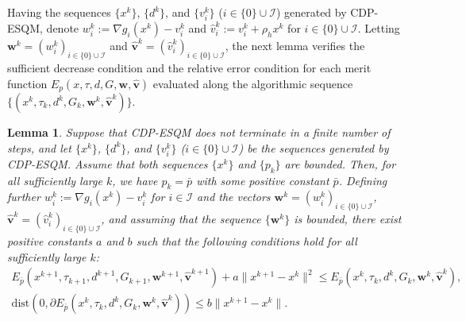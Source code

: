 \documentclass[11pt,a4paper]{article}
\def\hat{\widehat}\def\Hat{\widehat}
\newtheorem{lemma}[theorem]{Lemma}
\theoremstyle{plain}
\begin{document}
Having the sequences $\{x^k\}$, $\{d^k\}$, {and $\{v_i^k\}$ ($i\in \{0\} \cup \mathcal I$)} generated by CDP-ESQM, denote $w_i^k := \nabla g_i(x^k) - v_i^k$ and $\hat{v}_i^k:=v_i^k+\rho_h x^k$ for {$i \in \{0\} \cup \mathcal I$}. {Letting $\mathbf{w}^k = (w_i^k)_{i\in\{0\}\cup\mathcal I}$ and $\mathbf{\hat{v}}^k = (\hat{v}_i^k)_{i\in\{0\}\cup\mathcal I}$}, the next lemma verifies the sufficient decrease condition and the relative error condition for each merit function $E_{p}(x,\tau,d,G,{\mathbf{w},\mathbf{\hat{v}}})$ evaluated along the algorithmic sequence $\{(x^k, \tau_k,d^k, G_k,{\mathbf{w}^k, \mathbf{\hat{v}}^k})\}$.


\begin{lemma}\label{lemma: error condition of E}
Suppose that CDP-ESQM does not terminate in a finite number of steps, and let $\{x^k\}$, $\{d^k\}$, and {$\{v_i^k\}$ ($i\in\{0\}\cup\mathcal I$)} be the sequences generated by CDP-ESQM. 
Assume that both sequences $\{x^k\}$ and $\{p_k\}$ are bounded. Then, for all sufficiently large $k$, we have $p_k = \bar{p}$ with some positive constant $\bar{p}$. Defining further {$w_i^k := \nabla g_i(x^k) - v_i^k$ for $i\in\mathcal I$ and the vectors $\mathbf{w}^k = (w_i^k)_{i\in\{0\}\cup\mathcal I}$, $\mathbf{\hat{v}}^k = (\hat{v}_i^k)_{i\in\{0\}\cup\mathcal I}$}, and assuming that the sequence $\{\mathbf{w}^k\}$ is bounded, there exist positive constants $a$ and $b$ such that the following conditions hold for all sufficiently large $k$:
\begin{gather}
E_{\bar{p}}(x^{k+1}, \tau_{k+1}, d^{k+1}, G_{k+1}, {\mathbf{w}^{k+1}, \mathbf{\hat{v}}^{k+1}}) + {a \|x^{k+1} - x^k\|^2} \le E_{\bar{p}}(x^k, \tau_k, d^k, G_k, {\mathbf{w}^k, \mathbf{\hat{v}}^k}),  \label{eq: suf_decrease} \\
\mathrm{dist}\left(0, \partial E_{\bar{p}}(x^{k}, \tau_{k}, d^{k}, G_{k}, {\mathbf{w}^{k}, \mathbf{\hat{v}}^{k}}) \right) \le {b\|x^{k+1} - x^k\|}. \label{eq: rel_err}
\end{gather}
\end{lemma}
\end{document}
